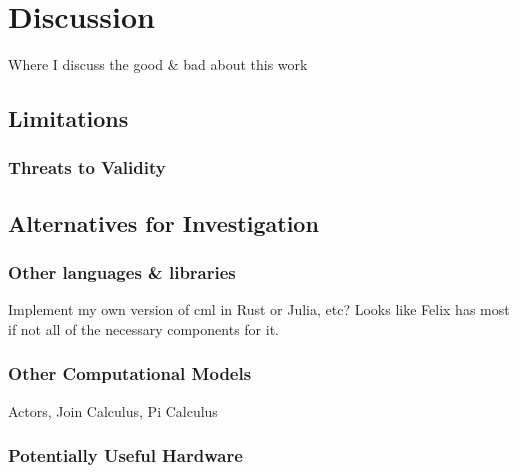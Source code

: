 \chapter{Discussion}

Where I discuss the good \& bad about this work





\section{Limitations}

\subsection{Threats to Validity}

\section{Alternatives for Investigation}

\subsection{Other languages \& libraries}
Implement my own version of \gls{cml} in Rust or Julia, etc?  Looks like Felix has most if not all of the necessary components for it.

\subsection{Other Computational Models}
Actors, Join Calculus, Pi Calculus

\subsection{Potentially Useful Hardware}

